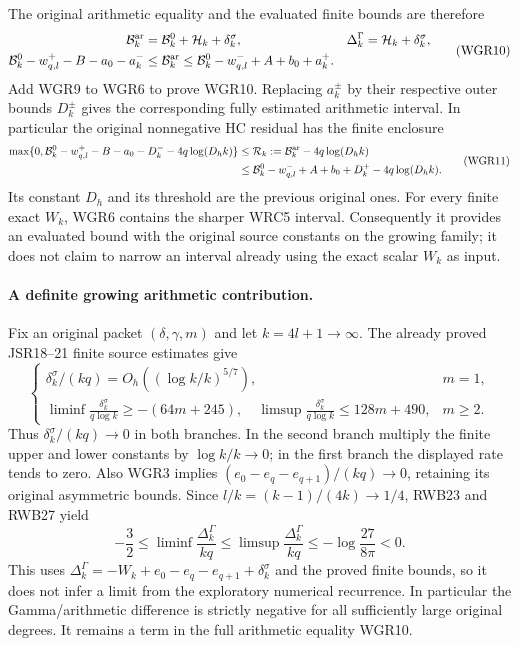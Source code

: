 \documentclass[11pt,a4paper]{article}
\begin{document}
The original arithmetic equality and the evaluated finite bounds are
therefore
\[
 \begin{aligned}
 \mathcal B_k^{\rm ar}&=\mathcal B_k^0+\mathcal H_k+\delta_k^\sigma,
       &\Delta_k^\Gamma&=\mathcal H_k+\delta_k^\sigma,\\
 \mathcal B_k^0-w^+_{q,l}-B-a_0-a_k^-
 &\le\mathcal B_k^{\rm ar}
       \le\mathcal B_k^0-w^-_{q,l}+A+b_0+a_k^+ .
 \end{aligned}\tag{WGR10}
\]
Add WGR9 to WGR6 to prove WGR10. Replacing $a_k^\pm$ by their
respective outer bounds $D_k^\pm$ gives the corresponding fully
estimated arithmetic interval. In particular the original nonnegative
HC residual has the finite enclosure
\[
 \begin{aligned}
 \max\{0,\mathcal B_k^0-w^+_{q,l}-B-a_0-D_k^-
                     -4q\log(D_hk)\}
 &\le\mathcal R_k:=\mathcal B_k^{\rm ar}-4q\log(D_hk)\\
 &\le\mathcal B_k^0-w^-_{q,l}+A+b_0+D_k^+
                     -4q\log(D_hk).
 \end{aligned}\tag{WGR11}
\]
Its constant $D_h$ and its threshold are the previous original ones.
For every finite exact $W_k$, WGR6 contains the sharper WRC5 interval.
Consequently it provides an evaluated bound with the original source
constants on the growing family; it does not claim to narrow an interval already using
the exact scalar $W_k$ as input.

\paragraph{A definite growing arithmetic contribution.}
Fix an original packet $(\delta,\gamma,m)$ and let $k=4l+1\to\infty$.
The already proved JSR18--21 finite source estimates give
\[
 \begin{cases}
 \delta_k^\sigma/(kq)=O_h((\log k/k)^{5/7}),&m=1,\\
 \displaystyle\liminf\frac{\delta_k^\sigma}{q\log k}\ge-(64m+245),
 \quad\displaystyle\limsup\frac{\delta_k^\sigma}{q\log k}
                                      \le128m+490,&m\ge2.
 \end{cases}\tag{WGR12}
\]
Thus $\delta_k^\sigma/(kq)\to0$ in both branches. In the second
branch multiply the finite upper and lower constants by $\log k/k\to0$;
in the first branch the displayed rate tends to zero. Also WGR3 implies
$(e_0-e_q-e_{q+1})/(kq)\to0$, retaining its original asymmetric bounds.
Since $l/k=(k-1)/(4k)\to1/4$, RWB23 and RWB27 yield
\[
 \boxed{-\frac32\le\liminf\frac{\Delta_k^\Gamma}{kq}
 \le\limsup\frac{\Delta_k^\Gamma}{kq}
 \le-\log\frac{27}{8\pi}<0.}
 \tag{WGR13}
\]
This uses $\Delta_k^\Gamma=-W_k+e_0-e_q-e_{q+1}+\delta_k^\sigma$
and the proved finite bounds, so it does not infer a limit from the
exploratory numerical recurrence. In particular the Gamma/arithmetic
difference is strictly negative for all sufficiently large original
degrees. It remains a term in the full arithmetic equality WGR10.
\end{document}
